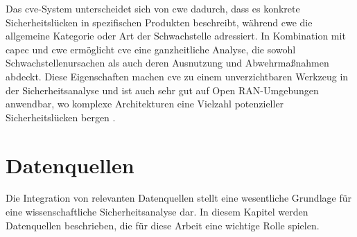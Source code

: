 Das \gls{cve}-System unterscheidet sich von \gls{cwe} dadurch, dass es konkrete Sicherheitslücken in spezifischen Produkten beschreibt, während \gls{cwe} die allgemeine Kategorie oder Art der Schwachstelle adressiert. In Kombination mit \gls{capec} und \gls{cwe} ermöglicht \gls{cve} eine ganzheitliche Analyse, die sowohl Schwachstellenursachen als auch deren Ausnutzung und Abwehrmaßnahmen abdeckt. Diese Eigenschaften machen \gls{cve} zu einem unverzichtbaren Werkzeug in der Sicherheitsanalyse und ist auch sehr gut auf Open RAN-Umgebungen anwendbar, wo komplexe Architekturen eine Vielzahl potenzieller Sicherheitslücken bergen \cite{CVEWebsite}.

\section{Datenquellen}
\label{sec:datenquellen}
Die Integration von relevanten Datenquellen stellt eine wesentliche Grundlage für eine wissenschaftliche Sicherheitsanalyse dar. In diesem Kapitel werden Datenquellen beschrieben, die für diese Arbeit eine wichtige Rolle spielen.
